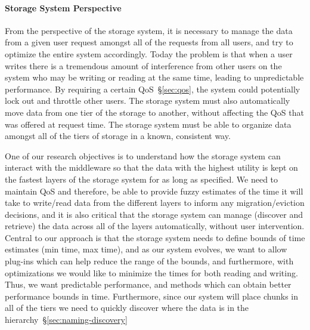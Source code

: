 \paragraph{Storage System Perspective}
\label{subsec:storage-perspective}
From the perspective of the storage system, it is necessary to manage the data from
a given user request amongst all of the requests from all users, and try to optimize the
entire system accordingly. Today the problem is that when a user writes there is a
tremendous amount of interference from other users on the system who may be
writing or reading at the same time, leading to unpredictable performance.
By requiring a certain QoS~\S\ref{sec:qos}, the system could potentially lock out and throttle other users. 
The storage system must also automatically move data from one tier of the storage to
another, without affecting the QoS that was offered at request
time. The storage system must be able to organize
data amongst all of the tiers of storage in a known, consistent way.

One of our research objectives is to understand how the
storage system can interact with the middleware   so
that the data with the highest utility is kept on the fastest layers of the
storage system for as long as specified. We need to maintain 
QoS and therefore, be able to provide fuzzy estimates of the time it will take to write/read data from
the different layers to inform any migration/eviction decisions, and it
is also critical that the storage system can manage (discover and retrieve) the data across all of the
layers automatically, without user intervention. 
Central to our approach is that the storage system needs to define bounds of time estimates
(min time, max time), and as our system evolves, we want to allow plug-ins which can help
reduce the range of the bounds, and furthermore, with optimizations we would like to minimize 
the times for both reading and writing. Thus, we want predictable performance, and methods
which can obtain better performance bounds in time. Furthermore, since our system will place chunks
in all of the tiers  we need to quickly discover where the data is in the hierarchy~\S\ref{sec:naming-discovery}



